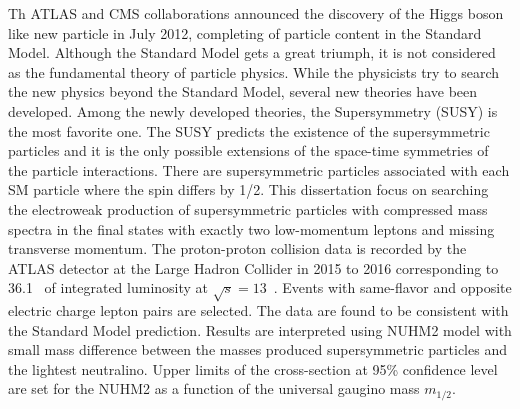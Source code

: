Th ATLAS and CMS collaborations announced the discovery of the Higgs boson like new particle in July 2012, completing of particle content in the Standard Model.
Although the Standard Model gets a great triumph, it is not considered as the fundamental theory of particle physics.
While the physicists try to search the new physics beyond the Standard Model, several new theories have been developed.
Among the newly developed theories, the Supersymmetry (SUSY) is the most favorite one.
The SUSY predicts the existence of the supersymmetric particles and it is the only possible extensions of the space-time symmetries of the particle interactions.
There are supersymmetric particles associated with each SM particle where the spin differs by 1/2.
This dissertation focus on searching the electroweak production of supersymmetric particles with compressed mass spectra in the final states with exactly two low-momentum leptons and missing transverse momentum.
The proton-proton collision data is recorded by the ATLAS detector at the Large Hadron Collider in 2015 to 2016 corresponding to 36.1~{\ifb} of integrated luminosity at $\sqrt{s} = 13$~{\TeV}.
Events with same-flavor and opposite electric charge lepton pairs are selected.
The data are found to be consistent with the Standard Model prediction.
Results are interpreted using NUHM2 model with small mass difference between the masses produced supersymmetric particles and the lightest neutralino.
Upper limits of the cross-section at 95\% confidence level are set for the NUHM2 as a function of the universal gaugino mass $m_{1/2}$.

